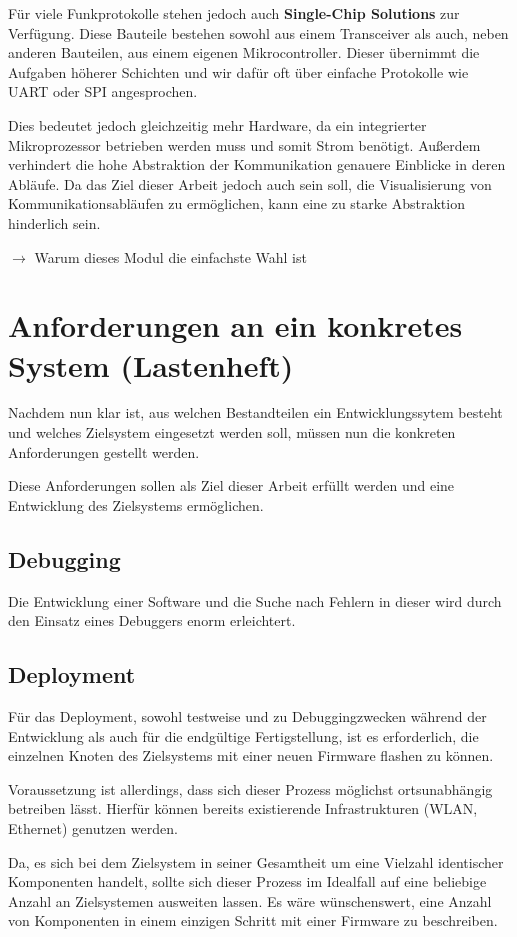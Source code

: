 Für viele Funkprotokolle stehen jedoch auch \textbf{Single-Chip Solutions}
zur Verfügung. Diese Bauteile bestehen sowohl aus einem Transceiver als auch,
neben anderen Bauteilen, aus einem eigenen Mikrocontroller. Dieser übernimmt die
Aufgaben höherer Schichten und wir dafür oft über einfache Protokolle wie UART
oder SPI angesprochen.

Dies bedeutet jedoch gleichzeitig mehr Hardware, da ein integrierter
Mikroprozessor betrieben werden muss und somit Strom benötigt.
Außerdem verhindert die hohe Abstraktion der Kommunikation genauere Einblicke in
deren Abläufe. Da das Ziel dieser Arbeit jedoch auch sein soll, die
Visualisierung von Kommunikationsabläufen zu ermöglichen, kann eine zu starke
Abstraktion hinderlich sein.


 $\rightarrow$ Warum dieses Modul die einfachste Wahl
ist
\section{Anforderungen an ein konkretes System (Lastenheft)}
Nachdem nun klar ist, aus welchen Bestandteilen ein Entwicklungssytem besteht
und welches Zielsystem eingesetzt werden soll, müssen nun die
konkreten Anforderungen gestellt werden.

Diese Anforderungen sollen als Ziel dieser Arbeit erfüllt werden und eine
Entwicklung des Zielsystems ermöglichen.

\subsection{Debugging} Die Entwicklung einer Software und die Suche nach Fehlern
in dieser wird durch den Einsatz eines Debuggers enorm erleichtert. 

\subsection{Deployment} Für das Deployment, sowohl testweise und zu
Debuggingzwecken während der Entwicklung als auch für die endgültige
Fertigstellung, ist es erforderlich, die einzelnen Knoten des Zielsystems mit
einer neuen Firmware flashen zu können.

Voraussetzung ist allerdings, dass sich dieser Prozess möglichst ortsunabhängig
betreiben lässt. Hierfür können bereits existierende Infrastrukturen (WLAN,
Ethernet) genutzen werden.

Da, es sich bei dem Zielsystem in seiner Gesamtheit um eine Vielzahl identischer
Komponenten handelt, sollte sich dieser Prozess im Idealfall auf
eine beliebige Anzahl an Zielsystemen ausweiten lassen. Es wäre wünschenswert,
eine Anzahl von Komponenten in einem einzigen Schritt mit einer Firmware zu
beschreiben.

